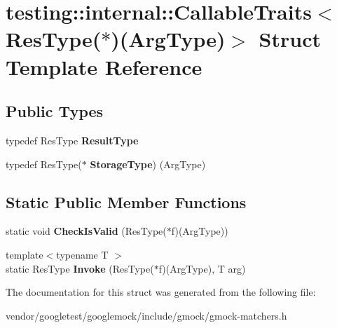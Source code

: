 \hypertarget{structtesting_1_1internal_1_1_callable_traits_3_01_res_type_07_5_08_07_arg_type_08_4}{}\section{testing\+:\+:internal\+:\+:Callable\+Traits$<$ Res\+Type($\ast$)(Arg\+Type)$>$ Struct Template Reference}
\label{structtesting_1_1internal_1_1_callable_traits_3_01_res_type_07_5_08_07_arg_type_08_4}
\subsection*{Public Types}
\begin{DoxyCompactItemize}
\item 
\mbox{\label{structtesting_1_1internal_1_1_callable_traits_3_01_res_type_07_5_08_07_arg_type_08_4_a1959235d286e9c9bb57c1c1139a0cbd8}} 
typedef Res\+Type {\bfseries Result\+Type}
\item 
\mbox{\label{structtesting_1_1internal_1_1_callable_traits_3_01_res_type_07_5_08_07_arg_type_08_4_a0ee48af3b40e5c5bcb48a78cdacf6d9c}} 
typedef Res\+Type($\ast$ {\bfseries Storage\+Type}) (Arg\+Type)
\end{DoxyCompactItemize}
\subsection*{Static Public Member Functions}
\begin{DoxyCompactItemize}
\item 
\mbox{\label{structtesting_1_1internal_1_1_callable_traits_3_01_res_type_07_5_08_07_arg_type_08_4_a184f502a16b227a2ec16e49bd23b2ded}} 
static void {\bfseries Check\+Is\+Valid} (Res\+Type($\ast$f)(Arg\+Type))
\item 
\mbox{\label{structtesting_1_1internal_1_1_callable_traits_3_01_res_type_07_5_08_07_arg_type_08_4_a8a61fc15cde62a0f06b2ee5a0a805c6c}} 
{\footnotesize template$<$typename T $>$ }\\static Res\+Type {\bfseries Invoke} (Res\+Type($\ast$f)(Arg\+Type), T arg)
\end{DoxyCompactItemize}


The documentation for this struct was generated from the following file\+:\begin{DoxyCompactItemize}
\item 
vendor/googletest/googlemock/include/gmock/gmock-\/matchers.\+h\end{DoxyCompactItemize}
